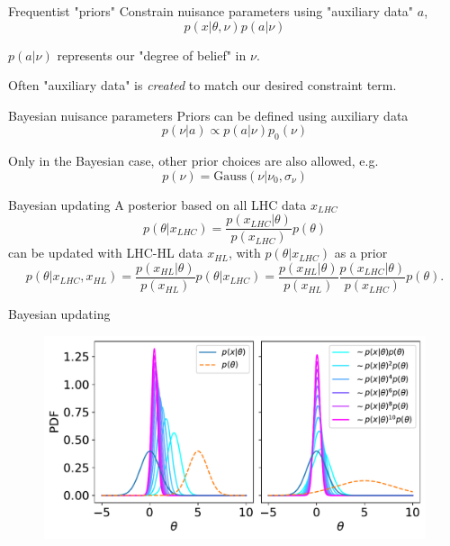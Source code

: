 \documentclass[
aspectratio=169,
14pt,
professionalfonts
]{beamer}
\begin{document}
\begin{frame}{Frequentist "priors"}
Constrain nuisance parameters using "auxiliary data" $a$,
$$p(x| \theta, \nu) p(a| \nu)$$

$p(a| \nu)$ represents our "degree of belief" in $\nu$.

\vspace{0.5cm}

Often "auxiliary data" is \textit{created} to match our desired constraint term.
\end{frame}

\begin{frame}{Bayesian nuisance parameters}
Priors can be defined using auxiliary data
$$p(\nu|a) \propto p(a|\nu) p_0(\nu)$$

Only in the Bayesian case, other prior choices are also allowed, e.g.
$$ p(\nu) = \text{Gauss}(\nu | \nu_0, \sigma_\nu)$$

\end{frame}

\begin{frame}{Bayesian updating}
    A posterior based on all LHC data $x_{LHC}$
    $$
    p(\theta | x_{LHC}) = \frac{p(x_{LHC}|\theta)}{p(x_{LHC})} p(\theta)
    $$
    can be updated with LHC-HL data $x_{HL}$, with $p(\theta | x_{LHC})$ as a prior
    $$
    p(\theta | x_{LHC}, x_{HL}) = \frac{p(x_{HL}|\theta)}{p(x_{HL})} p(\theta | x_{LHC}) = \frac{p(x_{HL}|\theta)}{p(x_{HL})} \frac{p(x_{LHC}|\theta)}{p(x_{LHC})} p(\theta).
    $$
\end{frame}

\begin{frame}{Bayesian updating}
    \begin{figure}
        \centering
        \includegraphics[width=0.9\linewidth]{../plots/updating.pdf}
    \end{figure}
\end{frame}
\end{document}
